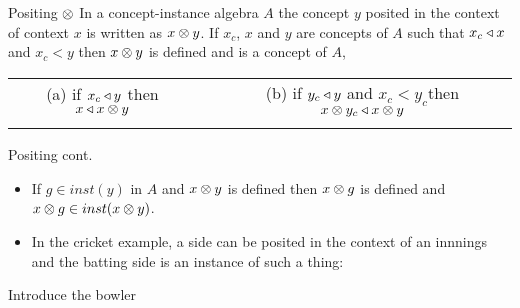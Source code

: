 \begin{frame}{Positing $\otimes$}
In a concept-instance algebra $A$ the concept $y$ posited in the context of context $x$ is written as $x \otimes y$.
If $x_c$, $x$ and $y$ are concepts of $A$ such that $x_c \triangleleft x$ and $x_c < y$ then $x \otimes y$ is defined and is a concept of $A$,
\pause
\begin{tabular} {c p{0.2cm} c}
(a) if $x_c \triangleleft y$ then $x \triangleleft x \otimes y$   &&   (b) if $y_c \triangleleft y$ and $x_c < y_c$then $ x \otimes y_c  \triangleleft x \otimes y$ \\[0.5cm]
&& \\
\end{tabular}
\end{frame}

\begin{frame} {Positing cont.}
\begin{itemize}
\item If $g \in inst(y)$ in $A$ and $x \otimes y$ is defined then $x \otimes g$ is defined and $x \otimes g \in inst(x \otimes y)$.
\medskip
\pause
\item In the cricket example, a side can be posited in the context of an innnings and the batting side is an instance of such a thing:

\end{itemize}
\end{frame}

\begin{frame}{Introduce the bowler}

\end{frame}





